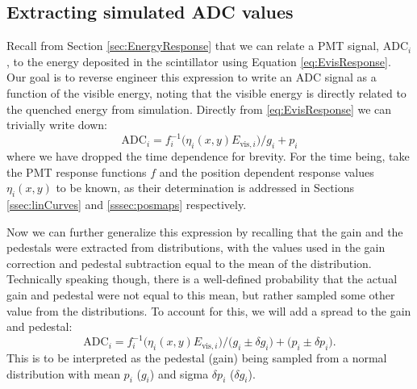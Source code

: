 \subsection{Extracting simulated ADC values}


Recall from Section \ref{sec:EnergyResponse} that we can relate a PMT signal,
$\mathrm{ADC}_i$, to the energy deposited in the scintillator
using Equation \ref{eq:EvisResponse}.
Our goal is to reverse engineer this expression to write an ADC signal as a
function of the visible energy, noting that the visible energy is directly
related to the quenched energy from simulation. Directly from \ref{eq:EvisResponse}
we can trivially write down:
%
\begin{equation} \label{eq:pmtResponse}
\mathrm{ADC}_i = f_i^{-1}\big(\eta_i(x,y) E_{\mathrm{vis},i} \big)/g_i + p_i
\end{equation}
%
where we have dropped the time dependence for brevity. For the time being, take
the PMT response functions $f$ and the position dependent response values $\eta_i(x,y)$ to be known,
as their determination is addressed in Sections \ref{ssec:linCurves} and \ref{sssec:posmaps}
respectively.

Now we can further generalize this expression by recalling that the gain and the pedestals
were extracted from distributions, with the values used in the gain correction and pedestal
subtraction equal to the mean of the distribution. Technically speaking though, there is a
well-defined probability that the actual gain and pedestal were not equal to this mean, but rather
sampled some other value from the distributions. To account for this, we will add a spread
to the gain and pedestal:
%
\begin{equation} 
  \mathrm{ADC}_i = f_i^{-1}\big(\eta_i(x,y)  E_{\mathrm{vis},i} \big)/\big(g_i\pm\delta g_i\big) + \big(p_i \pm \delta p_i\big).
  \label{eq:pmtResponse}
\end{equation}
%
This is to be interpreted as the pedestal (gain) being sampled from a normal
distribution with mean $p_i$ ($g_i$) and sigma $\delta p_i$ ($\delta g_i$).


